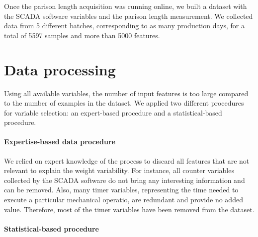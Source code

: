 
Once the parison length acquisition was running online, we built a dataset with the SCADA software variables and the parison length measurement. We collected data from 5 different batches, corresponding to as many production days, for a total of 5597 samples and more than 5000 features. 

\section{Data processing}

Using all available variables, the number of input features is too large compared to the number of examples in the dataset. We applied two different procedures for variable selection: an expert-based procedure and a statistical-based procedure.

\paragraph{Expertise-based data procedure}

We relied on expert knowledge of the process to discard all features that are not relevant to explain the weight variability. For instance, all counter variables collected by the SCADA software do not bring any interesting information and can be removed. Also, many timer variables, representing the time needed to execute a particular mechanical operatio, are redundant and provide no added value. Therefore, most of the timer variables have been removed from the dataset.

\paragraph{Statistical-based procedure}

